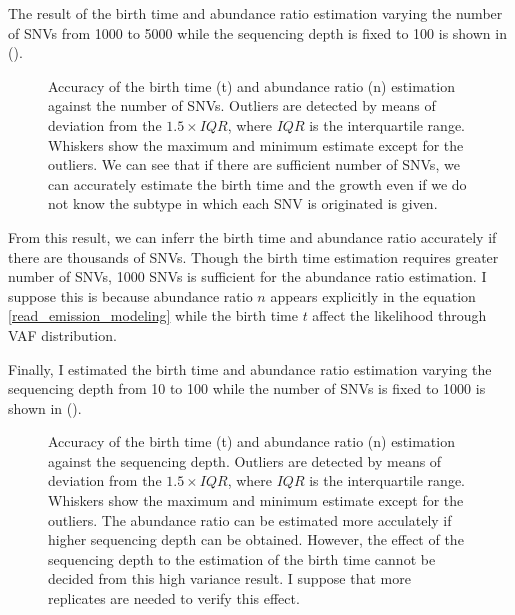 \documentclass{article}
\begin{document}
The result of the birth time and abundance ratio estimation varying the number of SNVs from 1000 to 5000 while the sequencing depth is fixed to 100 is shown in ().

\begin{figure}[H]
   \caption{
 Accuracy of the birth time (t) and abundance ratio (n) estimation against the number of SNVs. Outliers are detected by means of deviation from the $1.5 \times IQR$, where $IQR$ is the interquartile range. Whiskers show the maximum and minimum estimate except for the outliers. We can see that if there are sufficient number of SNVs, we can accurately estimate the birth time and the growth even if we do not know the subtype in which each SNV is originated is given.
  }
 \label{fig: read_emission_snv}
\end{figure}

From this result, we can inferr the birth time and abundance ratio accurately if there are thousands of SNVs.
Though the birth time estimation requires greater number of SNVs, 1000 SNVs is sufficient for the abundance ratio estimation.
I suppose this is because abundance ratio $n$ appears explicitly in the equation \ref{read_emission_modeling} while the birth time $t$ affect the likelihood through VAF distribution.

Finally, I estimated the birth time and abundance ratio estimation varying the sequencing depth from 10 to 100 while the number of SNVs is fixed to 1000 is shown in ().

\begin{figure}[H]
   \caption{
 Accuracy of the birth time (t) and abundance ratio (n) estimation against the sequencing depth. Outliers are detected by means of deviation from the $1.5 \times IQR$, where $IQR$ is the interquartile range. Whiskers show the maximum and minimum estimate except for the outliers. The abundance ratio can be estimated more acculately if higher sequencing depth can be obtained.
 However, the effect of the sequencing depth to the estimation of the birth time cannot be decided from this high variance result. I suppose that more replicates are needed to verify this effect.
  }
 \label{fig: read_emission_coverage}
\end{figure}
\end{document}

